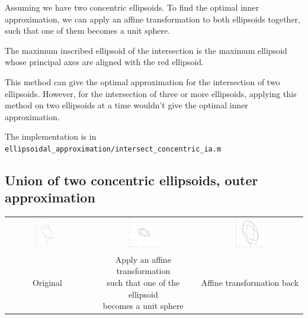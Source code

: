 \documentclass{article}
\begin{document}
Assuming we have two concentric ellipsoids. To find the optimal inner approximation, we can apply an affine transformation to both ellipsoids together, such that one of them becomes a unit sphere. 

The maximum inscribed ellipsoid of the intersection is the maximum ellipsoid whose principal axes are aligned with the red ellipsoid.

This method can give the optimal approximation for the intersection of two ellipsoids. However, for the intersection of three or more ellipsoids, applying this method on two ellipsoids at a time wouldn't give the optimal inner approximation.

The implementation is in \texttt{ellipsoidal\_approximation/intersect\_concentric\_ia.m}

\subsection{Union of two concentric ellipsoids, outer approximation}
\begin{table}[H]
	\centering
	\begin{tabular}{ccc}
		\includegraphics[width=0.3\textwidth]{union_concentric_oa/1.pdf} & \includegraphics[width=0.3\textwidth]{union_concentric_oa/2.pdf} & \includegraphics[width=0.3\textwidth]{union_concentric_oa/3.pdf}\\
		Original & \makecell{Apply an affine transformation \\such that one of the ellipsoid \\becomes a unit sphere} & Affine transformation back
	\end{tabular}
	\label{union_concentric_oa}
\end{table}
\end{document}
